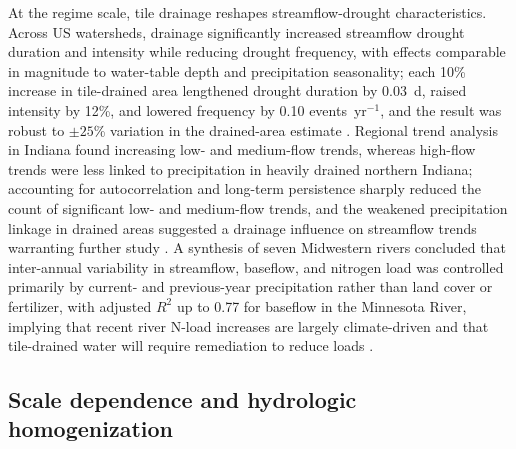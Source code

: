 At the regime scale, tile drainage reshapes streamflow-drought characteristics. Across US watersheds, drainage significantly increased streamflow drought duration and intensity while reducing drought frequency, with effects comparable in magnitude to water-table depth and precipitation seasonality; each 10\% increase in tile-drained area lengthened drought duration by 0.03~d, raised intensity by 12\%, and lowered frequency by 0.10 events~yr$^{-1}$, and the result was robust to $\pm25$\% variation in the drained-area estimate \parencite{Adelsperger2024}. Regional trend analysis in Indiana found increasing low- and medium-flow trends, whereas high-flow trends were less linked to precipitation in heavily drained northern Indiana; accounting for autocorrelation and long-term persistence sharply reduced the count of significant low- and medium-flow trends, and the weakened precipitation linkage in drained areas suggested a drainage influence on streamflow trends warranting further study \parencite{Kumar2009}. A synthesis of seven Midwestern rivers concluded that inter-annual variability in streamflow, baseflow, and nitrogen load was controlled primarily by current- and previous-year precipitation rather than land cover or fertilizer, with adjusted $R^2$ up to 0.77 for baseflow in the Minnesota River, implying that recent river N-load increases are largely climate-driven and that tile-drained water will require remediation to reduce loads \parencite{Baeumler2020}.

\subsection{Scale dependence and hydrologic homogenization}

